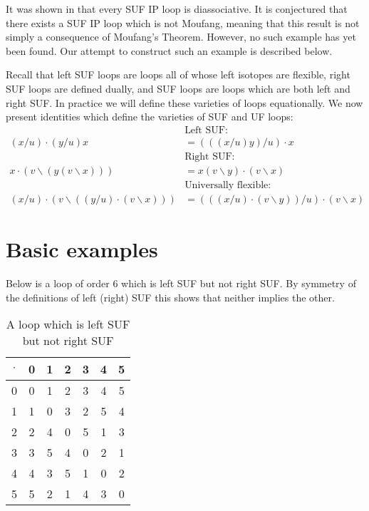 \documentclass[12pt, twoside, openright]{report}
\theoremstyle{definition}
\newcommand{\ldv}{\backslash}       %
\newcommand{\rdv}{/}                %
\begin{document}
It was shown in \cite{SUF} that every SUF IP loop is diassociative. It is conjectured that there
  exists a SUF IP loop which is not Moufang, meaning that this result is not simply a consequence
  of Moufang's Theorem. However, no such example has yet been found. Our attempt to construct such
  an example is described below.

Recall that left SUF loops are loops all of whose left isotopes are flexible, right SUF loops are
  defined dually, and SUF loops are loops which are both left and right SUF. In practice we will
  define these varieties of loops equationally. We now present identities which define the
  varieties of SUF and UF loops:
\begin{align*}
  &\text{Left SUF:}\\
  (x\rdv u) \cdot (y\rdv u)x &= (((x\rdv u)y)\rdv u)\cdot x\\
  &\text{Right SUF:}\\
  x\cdot (v\ldv(y(v\ldv x))) &= x(v\ldv y)\cdot (v\ldv x)\\
  &\text{Universally flexible:}\\
  (x\rdv u)\cdot (v\ldv ((y\rdv u)\cdot (v\ldv x))) &= (((x\rdv u)\cdot (v\ldv y))\rdv u)\cdot (v\ldv x)
\end{align*}

\section{Basic examples}

Below is a loop of order $6$ which is left SUF but not right SUF. By symmetry of the definitions of
  left (right) SUF this shows that neither implies the other.

\begin{table}[H]
  \centering
  \begin{tabular}{c| c c c c c c}
      $\cdot$ & 0 & 1 & 2 & 3 & 4 & 5\\
      \hline\hline
      0 & 0 & 1 & 2 & 3 & 4 & 5\\
      1 & 1 & 0 & 3 & 2 & 5 & 4\\
      2 & 2 & 4 & 0 & 5 & 1 & 3\\
      3 & 3 & 5 & 4 & 0 & 2 & 1\\
      4 & 4 & 3 & 5 & 1 & 0 & 2\\
      5 & 5 & 2 & 1 & 4 & 3 & 0
  \end{tabular}
  \caption{A loop which is left SUF but not right SUF}
\end{table}
\end{document}
